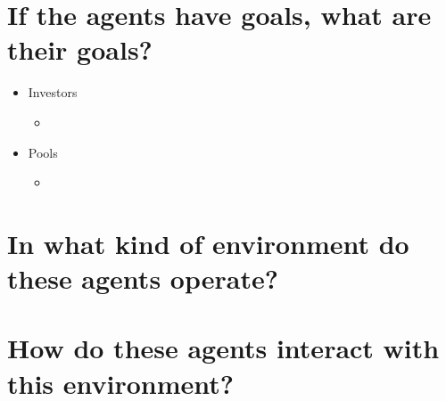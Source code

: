 \documentclass[]{article}
\begin{document}
\section{If the agents have goals, what are their goals?}
\begin{itemize}
	\item Investors
	\begin{itemize}
		\item 
	\end{itemize}
	\item Pools
	\begin{itemize}
		\item 
	\end{itemize}
\end{itemize}
\section{In what kind of environment do these agents operate?}
\section{How do these agents interact with this environment?}
\end{document}
